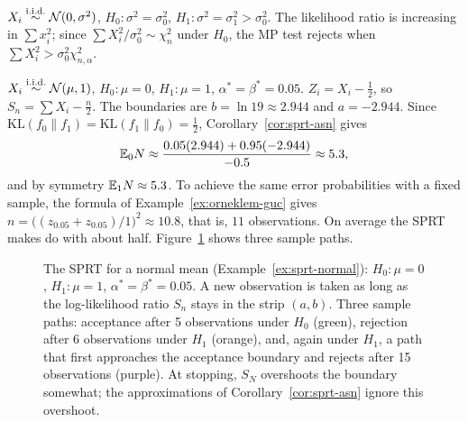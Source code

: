 \documentclass[main.tex]{subfiles}
\begin{document}
\begin{example}
$X_i\overset{\text{i.i.d.}}{\sim}\mathcal{N}(0,\sigma^2)$, $H_0:\sigma^2=\sigma_0^2$, $H_1:\sigma^2=\sigma_1^2>\sigma_0^2$. The likelihood ratio is increasing in $\sum x_i^2$; since $\sum X_i^2/\sigma_0^2\sim\chi^2_n$ under $H_0$, the MP test rejects when $\sum X_i^2>\sigma_0^2\chi^2_{n,\alpha}$.
\end{example}

\begin{example}\label{ex:sprt-normal}
$X_i\overset{\text{i.i.d.}}{\sim}\mathcal{N}(\mu,1)$, $H_0:\mu=0$, $H_1:\mu=1$, $\alpha^*=\beta^*=0.05$. $Z_i=X_i-\frac12$, so $S_n=\sum X_i-\frac n2$. The boundaries are $b=\ln19\approx2.944$ and $a=-2.944$. Since $\mathrm{KL}(f_0\|f_1)=\mathrm{KL}(f_1\|f_0)=\frac12$, Corollary~\ref{cor:sprt-asn} gives
\[
\mathbb{E}_0N\approx\frac{0.05(2.944)+0.95(-2.944)}{-0.5}\approx5.3,
\]
and by symmetry $\mathbb{E}_1N\approx5.3$. To achieve the same error probabilities with a fixed sample, the formula of Example~\ref{ex:orneklem-guc} gives $n=\big((z_{0.05}+z_{0.05})/1\big)^2\approx10.8$, that is, $11$ observations. On average the SPRT makes do with about half. Figure~\ref{fig:sprt} shows three sample paths.
\end{example}

\begin{figure}[ht]
\centering
{}
\caption{The SPRT for a normal mean (Example~\ref{ex:sprt-normal}): $H_0:\mu=0$, $H_1:\mu=1$, $\alpha^*=\beta^*=0.05$. A new observation is taken as long as the log-likelihood ratio $S_n$ stays in the strip $(a,b)$. Three sample paths: acceptance after 5 observations under $H_0$ (green), rejection after 6 observations under $H_1$ (orange), and, again under $H_1$, a path that first approaches the acceptance boundary and rejects after 15 observations (purple). At stopping, $S_N$ overshoots the boundary somewhat; the approximations of Corollary~\ref{cor:sprt-asn} ignore this overshoot.}\label{fig:sprt}
\end{figure}
\end{document}
